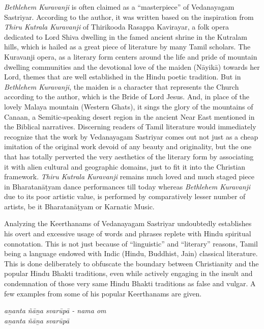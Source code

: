 \textit{Bethlehem Kuravanji} is often claimed as a “masterpiece” of Vedanaya\-gam Sastriyar. According to the author, it was written based on the inspiration from \textit{Thiru Kutrala Kuravanji} of Thirikooda Rasappa Kavirayar, a folk opera dedicated to Lord Shiva dwelling in the famed ancient shrine in the Kutralam hills, which is hailed as a great piece of literature by many Tamil scholars. The Kuravanji opera, as a literary form centers around the life and pride of mountain dwelling communities and the devotional love of the maiden (Nāyikā) towards her Lord, themes that are well established in the Hindu poetic tradition. But in \textit{Bethlehem Kuravanji}, the maiden is a character that represents the Church according to the author, which is the Bride of Lord Jesus. And, in place of the lovely Malaya mountain (Western Ghats), it sings the glory of the mountains of Canaan, a Semitic-speaking desert region in the ancient Near East mentioned in the Biblical narratives. Discerning readers of Tamil literature would immediately recognize that the work by Vedanayagam Sastriyar comes out not just as a cheap imitation of the original work devoid of any beauty and originality, but the one that has totally perverted the very aesthetics of the literary form by associating it with alien cultural and geographic domains, just to fit it into the Christian framework. \textit{Thiru Kutrala Kuravanji }remains much loved and much staged piece in Bharatanāṭyam dance performances till today whereas \textit{Bethlehem Kuravanji }due to its poor artistic value, is performed by comparatively lesser number of artists, be it Bharatanāṭyam or Karnatic Music.

\newpage

Analyzing the Keerthanams of Vedanayagam Sastriyar undoubtedly establishes his overt and excessive usage of words and phrases replete with Hindu spiritual connotation. This is not just because of “linguistic” and “literary” reasons, Tamil being a language endowed with Indic (Hindu, Buddhist, Jain) classical literature. This is done deliberately to obfuscate the boundary between Christianity and the popular Hindu Bhakti traditions, even while actively engaging in the insult and condemnation of those very same Hindu Bhakti traditions as false and vulgar. A few examples from some of his popular Keerthanams are given.

\begin{myquote}
\textit{aṉanta ñāṉa svarūpā - nama om\\ aṉanta ñāṉa svarūpā}
\end{myquote}

